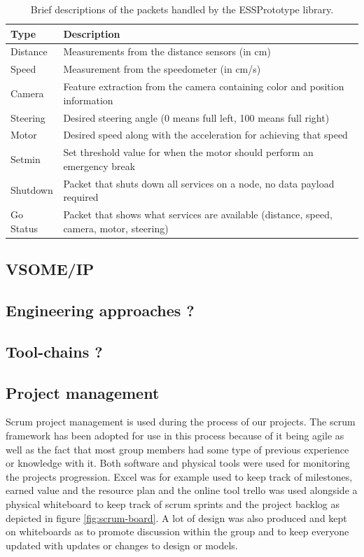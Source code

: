 \documentclass[11pt, titlepage]{article} %
\begin{document}
\begin{table}
  \caption{Brief descriptions of the packets handled by the ESSPrototype library.}
  \label{tab:packets}
  \centering
  \begin{tabular}{|l|l|} \hline
    \textbf{Type} & \textbf{Description}  \\ \hline
    Distance & Measurements from the distance sensors (in cm) \\ \hline
    Speed & Measurement from the speedometer (in cm/s) \\ \hline
    Camera & Feature extraction from the camera containing color and position information  \\ \hline
    Steering & Desired steering angle (0 means full left, 100 means full right)  \\ \hline
    Motor & Desired speed along with the acceleration for achieving that speed \\ \hline
    Setmin & Set threshold value for when the motor should perform an emergency break  \\ \hline
    Shutdown & Packet that shuts down all services on a node, no data payload required  \\ \hline
    Go Status & Packet that shows what services are available (distance, speed, camera, motor, steering)  \\ \hline
     \end{tabular}
\end{table}

\subsection{VSOME/IP}
\subsection{Engineering approaches ?}
\subsection{Tool-chains ?}
\subsection{Project management}
Scrum project management is used during the process of our projects.
The scrum framework has been adopted for use in this process because of it being agile as well as the fact that most group members had some type of previous experience or knowledge with it. Both software and physical tools were used for monitoring the projects progression. Excel was for example used to keep track of milestones, earned value and the resource plan and the online tool trello was used alongside a physical whiteboard to keep track of scrum sprints and the project backlog as depicted in figure \ref{fig:scrum-board}. A lot of design was also produced and kept on whiteboards as to promote discussion within the group and to keep everyone updated with updates or changes to design or models.
\end{document}
